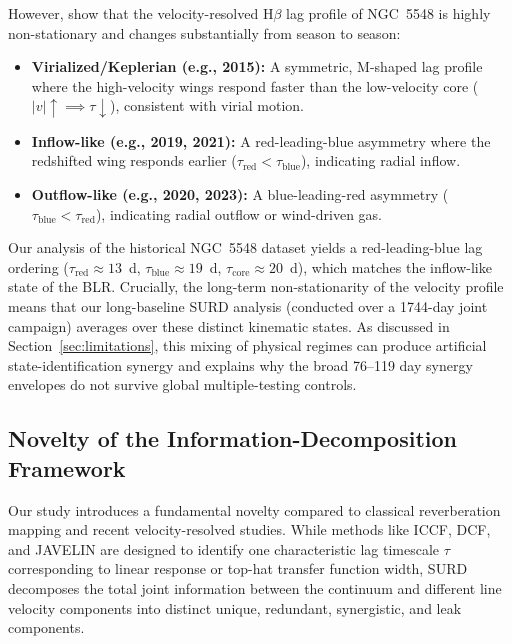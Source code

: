 \documentclass[fleqn,usenatbib]{mnras}
\begin{document}
However, \textcite{LongDexter2025} show that the velocity-resolved H\(\beta\) lag profile of NGC~5548 is highly non-stationary and changes substantially from season to season:
\begin{itemize}
    \item \textbf{Virialized/Keplerian (e.g., 2015):} A symmetric, M-shaped lag profile where the high-velocity wings respond faster than the low-velocity core ($|v| \uparrow \implies \tau \downarrow$), consistent with virial motion.
    \item \textbf{Inflow-like (e.g., 2019, 2021):} A red-leading-blue asymmetry where the redshifted wing responds earlier ($\tau_{\mathrm{red}} < \tau_{\mathrm{blue}}$), indicating radial inflow.
    \item \textbf{Outflow-like (e.g., 2020, 2023):} A blue-leading-red asymmetry ($\tau_{\mathrm{blue}} < \tau_{\mathrm{red}}$), indicating radial outflow or wind-driven gas.
\end{itemize}
Our analysis of the historical NGC~5548 dataset yields a red-leading-blue lag ordering (\(\tau_{\mathrm{red}} \approx 13\)~d, \(\tau_{\mathrm{blue}} \approx 19\)~d, \(\tau_{\mathrm{core}} \approx 20\)~d), which matches the inflow-like state of the BLR. Crucially, the long-term non-stationarity of the velocity profile means that our long-baseline SURD analysis (conducted over a 1744-day joint campaign) averages over these distinct kinematic states. As discussed in Section~\ref{sec:limitations}, this mixing of physical regimes can produce artificial state-identification synergy and explains why the broad 76--119 day synergy envelopes do not survive global multiple-testing controls.

\subsection{Novelty of the Information-Decomposition Framework}
\label{sec:novelty_framework}

Our study introduces a fundamental novelty compared to classical reverberation mapping and recent velocity-resolved studies. While methods like ICCF, DCF, and JAVELIN are designed to identify one characteristic lag timescale $\tau$ corresponding to linear response or top-hat transfer function width, SURD decomposes the total joint information between the continuum and different line velocity components into distinct unique, redundant, synergistic, and leak components.
\end{document}
